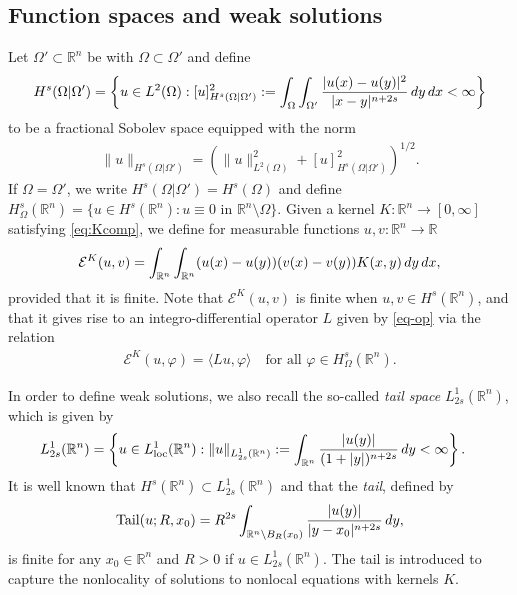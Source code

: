 \documentclass[11pt,reqno]{amsart}
\theoremstyle{plain}
\theoremstyle{definition}
\numberwithin{equation}{section}
\newcommand{\R}{\mathbb{R}}
\newcommand{\1}{\mathbbm{1}}
\DeclareMathOperator{\tail}{Tail}
\renewcommand{\d}{\textnormal{\,d}}
\begin{document}
\subsection{Function spaces and weak solutions}
Let $\Omega' \subset \R^n$ be with $\Omega \subset \Omega'$ and define
\begin{align*}
    H^s(\Omega | \Omega')=\left\{ u \in L^2(\Omega): [u]_{H^s(\Omega | \Omega')}^2 := \int_{\Omega} \int_{\Omega'} \frac{|u(x)-u(y)|^2}{|x-y|^{n+2s}} \d y \d x < \infty \right\}
\end{align*}
to be a fractional Sobolev space equipped with the norm
\begin{align*}
    \|u\|_{H^s(\Omega | \Omega')} = \left( \|u\|_{L^2(\Omega)}^2 + [u]_{H^s(\Omega | \Omega')}^2 \right)^{1/2}.
\end{align*}
If $\Omega = \Omega'$, we write $H^s(\Omega | \Omega') = H^s(\Omega)$ and define $H^s_\Omega(\R^n)= \{ u \in H^s(\R^n): u \equiv 0 \text{ in } \R^n \setminus \Omega \}$. Given a kernel $K:\R^n \to [0, \infty]$ satisfying \eqref{eq:Kcomp}, we define for measurable functions $u, v: \R^n \to \R$
\begin{align*}
    \mathcal{E}^K(u, v) = \int_{\R^n} \int_{\R^n} (u(x)-u(y))(v(x)-v(y)) K(x, y) \d y \d x,
\end{align*}
provided that it is finite. Note that $\mathcal{E}^K(u, v)$ is finite when $u, v \in H^s(\R^n)$, and that it gives rise to an integro-differential operator $L$ given by \eqref{eq-op} via the relation
\begin{align}\label{eq-weak-formulation}
    \mathcal{E}^K(u, \varphi) = \langle Lu, \varphi \rangle \quad\text{for all }\varphi \in H^s_\Omega(\R^n).
\end{align}

In order to define weak solutions, we also recall the so-called \emph{tail space} $L^1_{2s}(\R^n)$, which is given by
\begin{align*}
    L^1_{2s}(\R^n)&=\left\{ u \in L^1_{\mathrm{loc}}(\R^n): \|u\|_{L^1_{2s}(\R^n)} := \int_{\R^n} \frac{|u(y)|}{(1+|y|)^{n+2s}} \d y < \infty \right\}.
\end{align*}
It is well known that $H^s(\R^n) \subset L^1_{2s}(\R^n)$ and that the \emph{tail}, defined by
\begin{align*}
    \tail(u; R, x_0) = R^{2s} \int_{\R^n \setminus B_R(x_0)} \frac{|u(y)|}{|y-x_0|^{n+2s}} \d y,
\end{align*}
is finite for any $x_0 \in \R^n$ and $R>0$ if $u \in L^1_{2s}(\R^n)$. The tail is introduced to capture the nonlocality of solutions to nonlocal equations with kernels $K$. 
\end{document}
